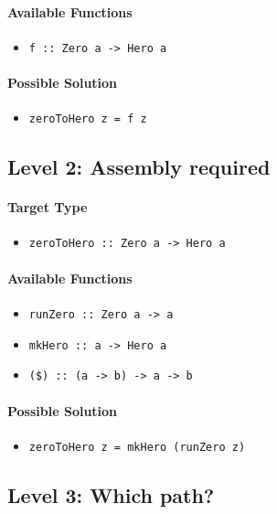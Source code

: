 \documentclass[preprint,12pt]{elsarticle}
\begin{document}
\paragraph{Available Functions} 
\begin{itemize}
    \item \texttt{f :: Zero a -> Hero a}
\end{itemize}

\paragraph{Possible Solution} 
\begin{itemize}
    \item \texttt{zeroToHero z = f z}
\end{itemize}


\subsection{Level 2: Assembly required}

\paragraph{Target Type} 
\begin{itemize}
    \item \texttt{zeroToHero :: Zero a -> Hero a}
\end{itemize}

\paragraph{Available Functions} 
\begin{itemize}
    \item \texttt{runZero :: Zero a -> a}
    \item \texttt{mkHero :: a -> Hero a}
    \item \texttt{(\$) :: (a -> b) -> a -> b}
\end{itemize}

\paragraph{Possible Solution} 
\begin{itemize}
    \item \texttt{zeroToHero z = mkHero (runZero z)}
\end{itemize}

\subsection{Level 3: Which path?}
\end{document}
